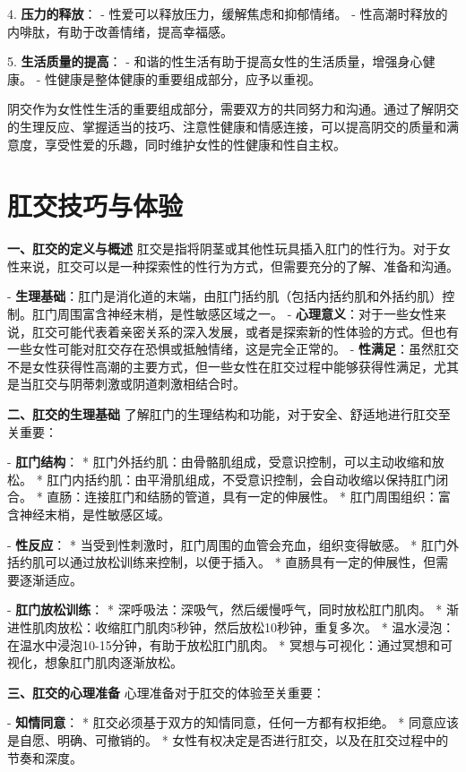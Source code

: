 \begin{enumerate}
  4. \textbf{压力的释放}：
     - 性爱可以释放压力，缓解焦虑和抑郁情绪。
     - 性高潮时释放的内啡肽，有助于改善情绪，提高幸福感。

  5. \textbf{生活质量的提高}：
     - 和谐的性生活有助于提高女性的生活质量，增强身心健康。
     - 性健康是整体健康的重要组成部分，应予以重视。

阴交作为女性性生活的重要组成部分，需要双方的共同努力和沟通。通过了解阴交的生理反应、掌握适当的技巧、注意性健康和情感连接，可以提高阴交的质量和满意度，享受性爱的乐趣，同时维护女性的性健康和性自主权。

\section{肛交技巧与体验}

  \textbf{一、肛交的定义与概述}
  肛交是指将阴茎或其他性玩具插入肛门的性行为。对于女性来说，肛交可以是一种探索性的性行为方式，但需要充分的了解、准备和沟通。

  - \textbf{生理基础}：肛门是消化道的末端，由肛门括约肌（包括内括约肌和外括约肌）控制。肛门周围富含神经末梢，是性敏感区域之一。
  - \textbf{心理意义}：对于一些女性来说，肛交可能代表着亲密关系的深入发展，或者是探索新的性体验的方式。但也有一些女性可能对肛交存在恐惧或抵触情绪，这是完全正常的。
  - \textbf{性满足}：虽然肛交不是女性获得性高潮的主要方式，但一些女性在肛交过程中能够获得性满足，尤其是当肛交与阴蒂刺激或阴道刺激相结合时。

  \textbf{二、肛交的生理基础}
  了解肛门的生理结构和功能，对于安全、舒适地进行肛交至关重要：

  - \textbf{肛门结构}：
    * 肛门外括约肌：由骨骼肌组成，受意识控制，可以主动收缩和放松。
    * 肛门内括约肌：由平滑肌组成，不受意识控制，会自动收缩以保持肛门闭合。
    * 直肠：连接肛门和结肠的管道，具有一定的伸展性。
    * 肛门周围组织：富含神经末梢，是性敏感区域。

  - \textbf{性反应}：
    * 当受到性刺激时，肛门周围的血管会充血，组织变得敏感。
    * 肛门外括约肌可以通过放松训练来控制，以便于插入。
    * 直肠具有一定的伸展性，但需要逐渐适应。

  - \textbf{肛门放松训练}：
    * 深呼吸法：深吸气，然后缓慢呼气，同时放松肛门肌肉。
    * 渐进性肌肉放松：收缩肛门肌肉5秒钟，然后放松10秒钟，重复多次。
    * 温水浸泡：在温水中浸泡10-15分钟，有助于放松肛门肌肉。
    * 冥想与可视化：通过冥想和可视化，想象肛门肌肉逐渐放松。

  \textbf{三、肛交的心理准备}
  心理准备对于肛交的体验至关重要：

  - \textbf{知情同意}：
    * 肛交必须基于双方的知情同意，任何一方都有权拒绝。
    * 同意应该是自愿、明确、可撤销的。
    * 女性有权决定是否进行肛交，以及在肛交过程中的节奏和深度。


\end{enumerate}
